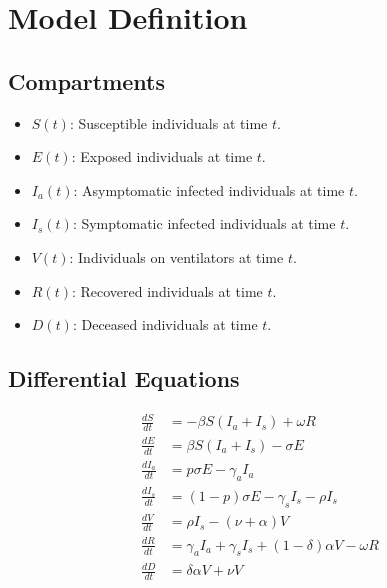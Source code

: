 \documentclass[lettersize, journal]{IEEEtran}
\begin{document}
\section{Model Definition}
\subsection{Compartments}
\begin{itemize}
    \item \( S(t) \): Susceptible individuals at time \( t \).
    \item \( E(t) \): Exposed individuals at time \( t \).
    \item \( I_a(t) \): Asymptomatic infected individuals at time \( t \).
    \item \( I_s(t) \): Symptomatic infected individuals at time \( t \).
    \item \( V(t) \): Individuals on ventilators at time \( t \).
    \item \( R(t) \): Recovered individuals at time \( t \).
    \item \( D(t) \): Deceased individuals at time \( t \).
\end{itemize}

\subsection{Differential Equations}
\begin{align*}
    \frac{dS}{dt}   & = -\beta S (I_a + I_s) + \omega R                              \\
    \frac{dE}{dt}   & = \beta S (I_a + I_s) - \sigma E                               \\
    \frac{dI_a}{dt} & = p \sigma E - \gamma_a I_a                                    \\
    \frac{dI_s}{dt} & = (1-p) \sigma E - \gamma_s I_s - \rho I_s                     \\
    \frac{dV}{dt}   & = \rho I_s - (\nu + \alpha) V                                  \\
    \frac{dR}{dt}   & = \gamma_a I_a + \gamma_s I_s + (1-\delta) \alpha V - \omega R \\
    \frac{dD}{dt}   & = \delta \alpha V + \nu V
\end{align*}
\end{document}

